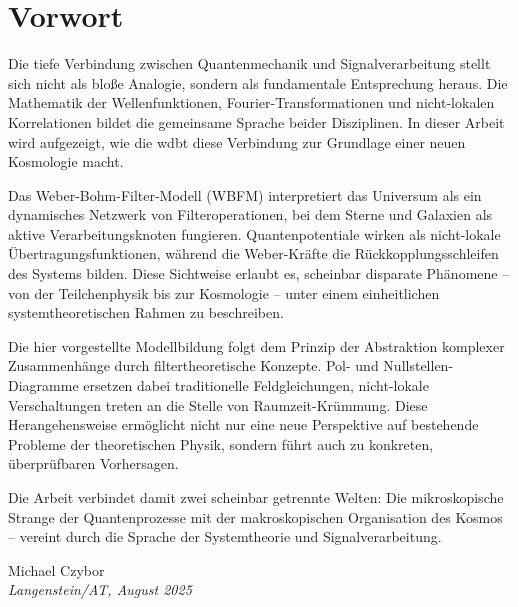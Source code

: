 \documentclass[11pt, a5paper, twoside, openright]{book}
\begin{document}
\chapter*{Vorwort}

Die tiefe Verbindung zwischen Quantenmechanik und Signalverarbeitung stellt sich nicht als bloße Analogie, sondern als fundamentale Entsprechung heraus. Die Mathematik der
Wellenfunktionen, Fourier-Transformationen und nicht-lokalen Korrelationen bildet die gemeinsame Sprache beider Disziplinen. In dieser Arbeit wird aufgezeigt, wie die
\gls{wdbt} diese Verbindung zur Grundlage einer neuen Kosmologie macht.

Das Weber-Bohm-Filter-Modell (WBFM) interpretiert das Universum als ein dynamisches Netzwerk von Filteroperationen, bei dem Sterne und Galaxien als aktive Verarbeitungsknoten
fungieren. Quantenpotentiale wirken als nicht-lokale Übertragungsfunktionen, während die Weber-Kräfte die Rückkopplungsschleifen des Systems bilden. Diese Sichtweise erlaubt
es, scheinbar disparate Phänomene – von der Teilchenphysik bis zur Kosmologie – unter einem einheitlichen systemtheoretischen Rahmen zu beschreiben.

Die hier vorgestellte Modellbildung folgt dem Prinzip der Abstraktion komplexer Zusammenhänge durch filtertheoretische Konzepte. Pol- und Nullstellen-Diagramme ersetzen dabei
traditionelle Feldgleichungen, nicht-lokale Verschaltungen treten an die Stelle von Raumzeit-Krümmung. Diese Herangehensweise ermöglicht nicht nur eine neue Perspektive auf
bestehende Probleme der theoretischen Physik, sondern führt auch zu konkreten, überprüfbaren Vorhersagen.

Die Arbeit verbindet damit zwei scheinbar getrennte Welten: Die mikroskopische Strange der Quantenprozesse mit der makroskopischen Organisation des Kosmos – vereint durch die
Sprache der Systemtheorie und Signalverarbeitung.

\begin{flushright}
    Michael Czybor \\
    \emph{Langenstein/AT, August 2025}
\end{flushright}

\tableofcontents
\listoffigures
\listoftables

\mainmatter

\appendix


\backmatter
\printbibliography[title=Literaturverzeichnis]
\glswritefiles
\printglossary[title=Glossar]
\printglossary[type=acronym, title=Abkürzungen]
\end{document}
